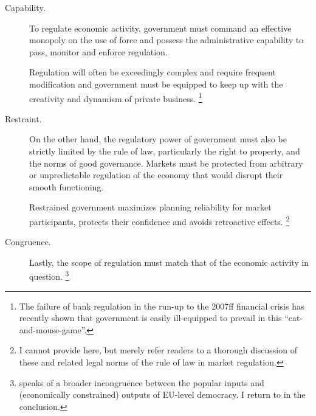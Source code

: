 \begin{description}
	\item[Capability.] \label{itm:capability} To regulate economic activity, government must command an effective monopoly on the use of force and possess the administrative capability to pass, monitor and enforce regulation.

	Regulation will often be exceedingly complex and require frequent modification and government must be equipped to keep up with the creativity and dynamism of private business.
	\footnote{
		The failure of bank regulation in the run-up to the 2007ff financial crisis has recently shown that government is easily ill-equipped to prevail in this ``cat-and-mouse-game''.
	}

	\item[Restraint.] \label{itm:restraint} On the other hand, the regulatory power of government must also be strictly limited by the rule of law, particularly the right to property, and the norms of good governance.
Markets must be protected from arbitrary or unpredictable regulation of the economy that would disrupt their smooth functioning.

	Restrained government maximizes planning reliability for market participants, protects their confidence and avoids retroactive effects.
	\footnote{
		I cannot provide here, but merely refer readers to a thorough discussion of these and related legal norms of the rule of law in market regulation.
	}

	\item[Congruence.] \label{itm:congruence}
	Lastly, the scope of regulation must match that of the economic activity in question.
	\footnote{
		\cite{Zurn-2000-aa} speaks of a broader incongruence between the popular inputs and (economically constrained) outputs of EU-level democracy.
		I return to in the conclusion.
	}


\end{description}
